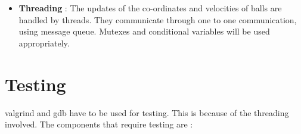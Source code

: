 \documentclass[]{article}
\begin{document}
\begin{itemize}
\begin{flushleft}
\begin{itemize}
\item \textbf{Threading} : The updates of the co-ordinates and velocities of balls are handled by threads. They communicate through one to one communication, using message queue. Mutexes and conditional variables will be used appropriately.


\end{itemize}


\end{flushleft}

\end{itemize}

\section{Testing}

valgrind and gdb have to be used for testing. This is because of the threading involved. The components that require testing are :
\end{document}
